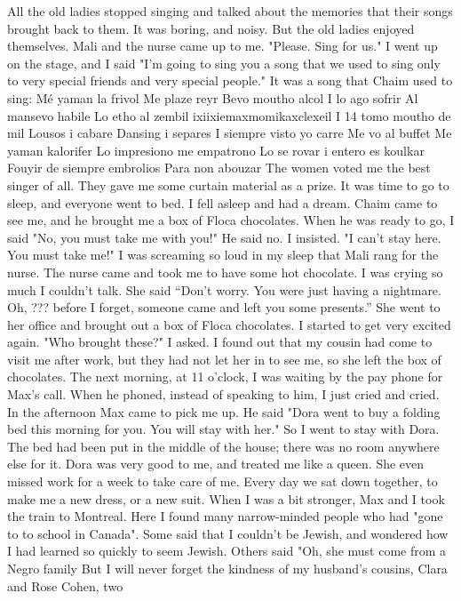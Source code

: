 All the old ladies stopped singing and talked about the memories that their 
songs brought back to them. It was boring, and noisy. But the old ladies enjoyed themselves. Mali and the nurse came up to me. "Please. Sing for us." 
I went up on the stage, and I said "I'm going to sing you a song that we used to 
sing only to very special friends and very special people." It was a song that Chaim 
used to sing: 
Mé yaman la frivol 
Me plaze reyr 
Bevo moutho alcol 
I lo ago sofrir 
Al mansevo habile 
Lo etho al zembil 
ixiixiemaxmomikaxclexeil 
I 14 tomo moutho de mil 
Lousos i cabare 
Dansing i separes 
I siempre visto yo carre 
Me vo al buffet 
Me yaman kalorifer 
Lo impresiono me empatrono 
Lo se rovar i entero es koulkar 
Fouyir de siempre embrolios 
Para non abouzar 
The women voted me the best singer of all. They gave me some curtain material as a 
prize.
It was time to go to sleep, and everyone went to bed. I fell asleep and had a 
dream. Chaim came to see me, and he brought me a box of Floca chocolates. When he 
was ready to go, I said "No, you must take me with you!" He said no. I insisted. 
"I can't stay here. You must take me!" I was screaming so loud in my sleep that Mali 
rang for the nurse. 
The nurse came and took me to have some hot chocolate. I was crying so much I couldn’t talk. She said “Don’t worry. You were just having a nightmare. Oh, ??? before I forget, someone came and left you some presents.”
She went to her office and brought out a box of Floca chocolates. I started to 
get very excited again. "Who brought these?" I asked. I found out that my cousin 
had come to visit me after work, but they had not let her in to see me, so she left 
the box of chocolates. 
The next morning, at 11 o'clock, I was waiting by the pay phone for Max's call. 
When he phoned, instead of speaking to him, I just cried and cried. In the afternoon 
Max came to pick me up. He said "Dora went to buy a folding bed this morning for you. 
You will stay with her." 
So I went to stay with Dora. The bed had been put in the middle of the house; 
there was no room anywhere else for it. Dora was very good to me, and treated me like 
a queen. She even missed work for a week to take care of me. Every day we sat down
together, to make me a new dress, or a new suit. When I was a bit stronger, Max and 
I took the train to Montreal. Here I found many narrow-minded people who had "gone to 
to school in Canada". Some said that I couldn't be Jewish, and wondered how I had 
learned so quickly to seem Jewish. Others said "Oh, she must come from a Negro family 
But I will never forget the kindness of my husband's cousins, Clara and Rose Cohen, two 
